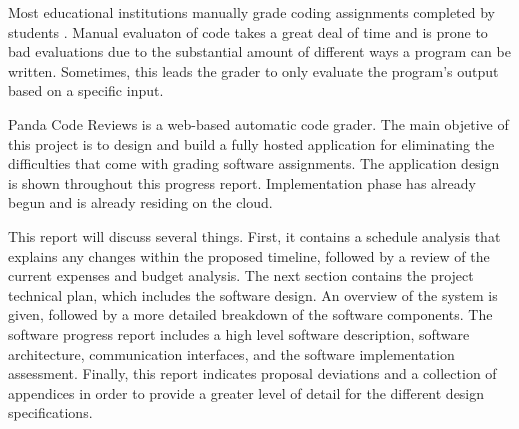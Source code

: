 



Most educational institutions manually grade coding assignments completed by students \cite{}. Manual evaluaton of code takes a great deal of time and is prone to bad evaluations due to the substantial amount of different ways a program can be written. Sometimes, this leads the grader to only evaluate the program's output based on a specific input.

Panda Code Reviews is a web-based automatic code grader. The main objetive of this project is to design and build a fully hosted application for eliminating the difficulties that come with grading software assignments. The application design is shown throughout this progress report. Implementation phase has already begun and is already residing on the cloud.

This report will discuss several things. First, it contains a schedule analysis that explains any changes within the proposed timeline, followed by a review of the current expenses and budget analysis. The next section contains the project technical plan, which includes the software design. An overview of the system is given, followed by a more detailed breakdown of the software components. The software progress report includes a high level software description, software architecture, communication interfaces, and the software implementation assessment. Finally, this report indicates proposal deviations and a collection of appendices in order to provide a greater level of detail for the different design specifications.